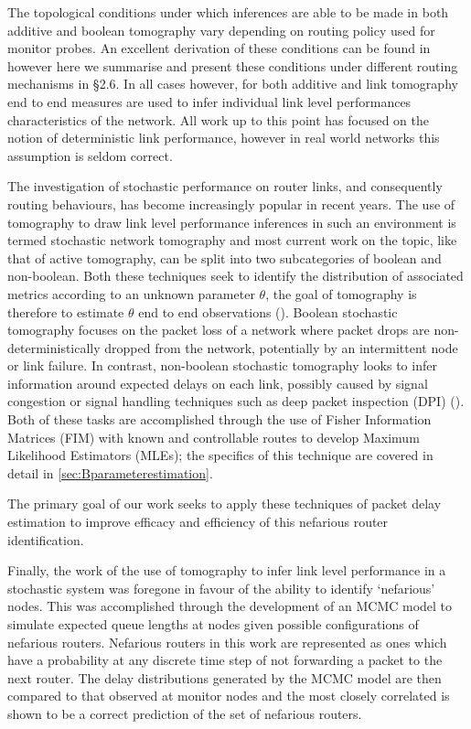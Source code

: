The topological conditions under which inferences are able to be made in both additive and boolean tomography vary depending on routing policy used for monitor probes. An excellent derivation of these conditions can be found in \cite{he_network_2021} however here we summarise and present these conditions under different routing mechanisms in §2.6. In all cases however, for both additive and link tomography end to end measures are used to infer individual link level performances characteristics of the network. All work up to this point has focused on the notion of deterministic link performance, however in real world networks this assumption is seldom correct.\par
The investigation of stochastic performance on router links, and consequently routing behaviours, has become increasingly popular in recent years. The use of tomography to draw link level performance inferences in such an environment is termed stochastic network tomography and most current work on the topic, like that of active tomography, can be split into two subcategories of boolean and non-boolean. Both these techniques seek to identify the distribution of associated metrics according to an unknown parameter $\theta$, the goal of tomography is therefore to estimate $\theta$ end to end observations (\cite{he_fisher_2015}). Boolean stochastic tomography focuses on the packet loss of a network where packet drops are non-deterministically dropped from the network, potentially by an intermittent node or link failure. In contrast, non-boolean stochastic tomography looks to infer information around expected delays on each link, possibly caused by signal congestion or signal handling techniques such as deep packet inspection (DPI) (\cite{el-maghraby_survey_2017}). Both of these tasks are accomplished through the use of Fisher Information Matrices (FIM) with known and controllable routes to develop Maximum Likelihood Estimators (MLEs); the specifics of this technique are covered in detail in \cref{sec:Bparameterestimation}.\par
{}
The primary goal of our work seeks to apply these techniques of packet delay estimation to improve efficacy and efficiency of this nefarious router identification.\par
Finally, the work of \cite{barnes_stochastic_2020} the use of tomography to infer link level performance in a stochastic system was foregone in favour of the ability to identify ‘nefarious’ nodes. This was accomplished through the development of an MCMC model to simulate expected queue lengths at nodes given possible configurations of nefarious routers. Nefarious routers in this work are represented as ones which have a probability at any discrete time step of not forwarding a packet to the next router. The delay distributions generated by the MCMC model are then compared to that observed at monitor nodes and the most closely correlated is shown to be a correct prediction of the set of nefarious routers. 
